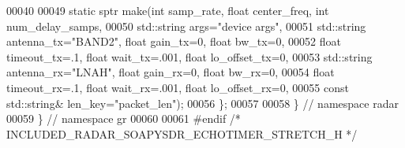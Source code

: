 \begin{DoxyCode}
00040 
00049       \textcolor{keyword}{static} sptr make(\textcolor{keywordtype}{int} samp_rate, \textcolor{keywordtype}{float} center_freq, \textcolor{keywordtype}{int} num\_delay\_samps,
00050         std::string args=\textcolor{stringliteral}{"device args"},
00051         std::string antenna\_tx=\textcolor{stringliteral}{"BAND2"}, \textcolor{keywordtype}{float} gain\_tx=0, \textcolor{keywordtype}{float} bw\_tx=0,
00052         \textcolor{keywordtype}{float} timeout\_tx=.1, \textcolor{keywordtype}{float} wait\_tx=.001, \textcolor{keywordtype}{float} lo\_offset\_tx=0,
00053         std::string antenna\_rx=\textcolor{stringliteral}{"LNAH"}, \textcolor{keywordtype}{float} gain\_rx=0, \textcolor{keywordtype}{float} bw\_rx=0,
00054         \textcolor{keywordtype}{float} timeout\_rx=.1, \textcolor{keywordtype}{float} wait\_rx=.001, \textcolor{keywordtype}{float} lo\_offset\_rx=0,
00055         \textcolor{keyword}{const} std::string& len\_key=\textcolor{stringliteral}{"packet\_len"});
00056     \};
00057 
00058   \} \textcolor{comment}{// namespace radar}
00059 \} \textcolor{comment}{// namespace gr}
00060 
00061 \textcolor{preprocessor}{#endif }\textcolor{comment}{/* INCLUDED\_RADAR\_SOAPYSDR\_ECHOTIMER\_STRETCH\_H */}\textcolor{preprocessor}{}
\end{DoxyCode}
